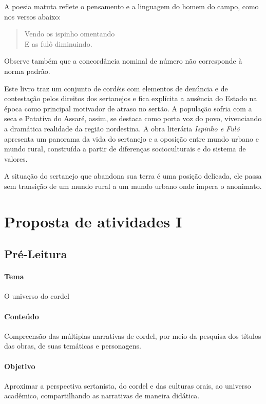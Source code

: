 \documentclass[12pt]{extarticle}
\begin{document}
A poesia matuta reflete o pensamento e a linguagem do homem do campo, como nos versos abaixo:  

\begin{verse}
Vendo os ispinho omentando\\
E as fulô diminuindo.\\
\end{verse}
 
Observe também que a concordância nominal de número não corresponde à norma padrão. 

Este livro traz um conjunto de cordéis com elementos de denúncia e de contestação pelos direitos dos sertanejos e fica explícita a ausência 
do Estado na época como principal motivador de atraso no sertão. A população sofria com a seca e Patativa do Assaré, assim, se destaca como 
porta voz do povo, vivenciando a dramática realidade da região nordestina. A obra literária \emph{Ispinho e Fulô} apresenta um panorama da 
vida do sertanejo e a oposição entre mundo urbano e mundo rural, construída a partir de diferenças socioculturais e do sistema de valores. 
 
A situação do sertanejo que abandona sua terra é uma posição delicada, ele passa sem transição de um mundo rural a um mundo urbano onde 
impera o anonimato. 

\section{Proposta de atividades I}

\subsection{Pré-Leitura}

\paragraph{Tema} O universo do cordel

\paragraph{Conteúdo} Compreensão das múltiplas narrativas de cordel, por meio da pesquisa 
dos títulos das obras, de suas temáticas e personagens. 

\paragraph{Objetivo} Aproximar a perspectiva sertanista, do cordel e das culturas orais, ao universo acadêmico, 
compartilhando as narrativas de maneira didática.
\end{document}
